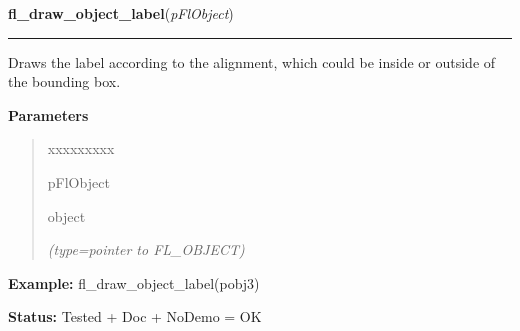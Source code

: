 \hspace{.8\funcindent}\begin{boxedminipage}{\funcwidth}

    \raggedright \textbf{fl\_draw\_object\_label}(\textit{pFlObject})

    \vspace{-1.5ex}

    \rule{\textwidth}{0.5\fboxrule}
\setlength{\parskip}{2ex}
    Draws the label according to the alignment, which could be inside or 
    outside of the bounding box.

\setlength{\parskip}{1ex}
      \textbf{Parameters}
      \vspace{-1ex}

      \begin{quote}
        \begin{Ventry}{xxxxxxxxx}

          \item[pFlObject]

          object

            {\it (type=pointer to FL\_OBJECT)}

        \end{Ventry}

      \end{quote}

\textbf{Example:} fl\_draw\_object\_label(pobj3)



\textbf{Status:} Tested + Doc + NoDemo = OK



    \end{boxedminipage}

    \label{xformslib:flbasic:fl_draw_object_label_outside}

    \vspace{0.5ex}


